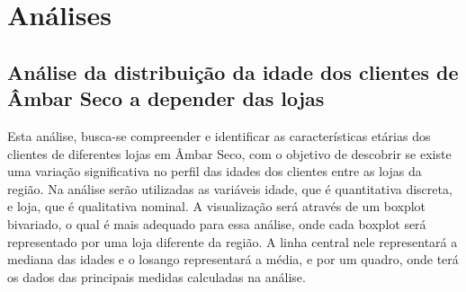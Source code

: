 \documentclass[
  portuguese,
]{estat/estat}
\author{}
\date{}
\let\oldsection\section
\renewcommand\section{\clearpage\oldsection}
\renewcommand*\contentsname{Índice}
\newcommand\contentsname{Índice}
\begin{document}
\fancyhf{} 

\fancyhead[L]{} %
\renewcommand{\headrulewidth}{0pt}   %

\fancyfoot[R]{\textcolor{white}{\thepage}} %

\pagestyle{fancy} 



\renewcommand*\contentsname{Sumário}
{
\hypersetup{linkcolor=}
\setcounter{tocdepth}{3}
\tableofcontents
}

\section{Análises}\label{anuxe1lises}

\subsection{Análise da distribuição da idade dos clientes de Âmbar Seco
a depender das
lojas}\label{anuxe1lise-da-distribuiuxe7uxe3o-da-idade-dos-clientes-de-uxe2mbar-seco-a-depender-das-lojas}

Esta análise, busca-se compreender e identificar as características
etárias dos clientes de diferentes lojas em Âmbar Seco, com o objetivo
de descobrir se existe uma variação significativa no perfil das idades
dos clientes entre as lojas da região. Na análise serão utilizadas as
variáveis idade, que é quantitativa discreta, e loja, que é qualitativa
nominal. A visualização será através de um boxplot bivariado, o qual é
mais adequado para essa análise, onde cada boxplot será representado por
uma loja diferente da região. A linha central nele representará a
mediana das idades e o losango representará a média, e por um quadro,
onde terá os dados das principais medidas calculadas na análise.
\end{document}
